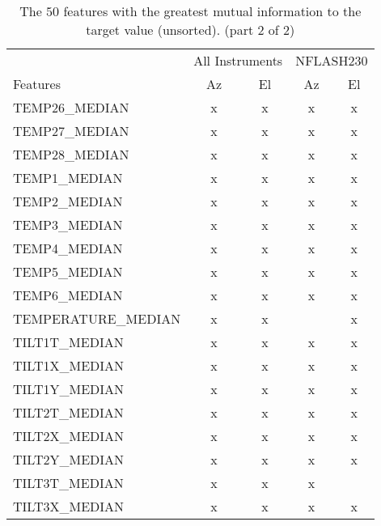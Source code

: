 \begin{table}[!htbp]
    \centering
    \caption{The $50$ features with the greatest mutual information to the target value (unsorted). (part 2 of 2)}
    \begin{tabular}{lcccc}
        \toprule
        & \multicolumn{2}{c}{All Instruments} & \multicolumn{2}{c}{NFLASH230}\\
        \cmidrule(lr){2-3} \cmidrule(lr){4-5}
        Features & Az & El & Az & El \\  \hline
        TEMP26\_MEDIAN        &      x &      x &      x &      x  \\ \hline
        TEMP27\_MEDIAN        &      x &      x &      x &      x  \\ \hline
        TEMP28\_MEDIAN        &      x &      x &      x &      x  \\ \hline
        TEMP1\_MEDIAN        &      x &      x &      x &      x   \\ \hline
        TEMP2\_MEDIAN        &      x &      x &      x &      x    \\ \hline
        TEMP3\_MEDIAN        &      x &      x &      x &      x    \\ \hline
        TEMP4\_MEDIAN        &      x &      x &      x &      x    \\ \hline
        TEMP5\_MEDIAN        &      x &      x &      x &      x    \\ \hline
        TEMP6\_MEDIAN        &      x &      x &      x &      x    \\ \hline
        TEMPERATURE\_MEDIAN  &      x &      x &        &      x    \\ \hline
        TILT1T\_MEDIAN       &      x &      x &      x &      x    \\ \hline
        TILT1X\_MEDIAN       &      x &      x &      x &      x    \\ \hline
        TILT1Y\_MEDIAN       &      x &      x &      x &      x    \\ \hline
        TILT2T\_MEDIAN       &      x &      x &      x &      x    \\ \hline
        TILT2X\_MEDIAN       &      x &      x &      x &      x    \\ \hline
        TILT2Y\_MEDIAN       &      x &      x &      x &      x    \\ \hline
        TILT3T\_MEDIAN       &      x &      x &      x &          \\ \hline
        TILT3X\_MEDIAN       &      x &      x &      x &      x   \\ \hline

\end{tabular}
\end{table}
